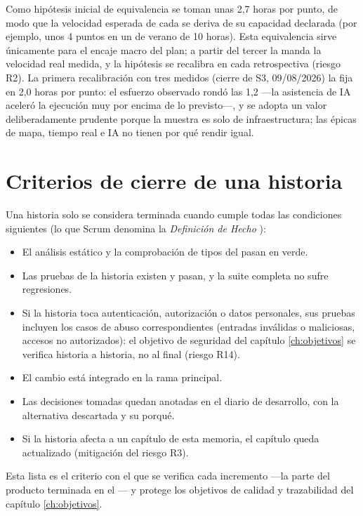 Como hipótesis inicial de equivalencia se toman unas 2,7 horas por punto, de modo que la velocidad esperada de cada  se deriva de su capacidad declarada (por ejemplo, unos 4 puntos en un  de verano de 10 horas).
Esta equivalencia sirve únicamente para el encaje macro del plan; a partir del tercer  la manda la velocidad real medida, y la hipótesis se recalibra en cada retrospectiva (riesgo R2).
La primera recalibración con tres  medidos (cierre de S3, 09/08/2026) la fija en 2,0 horas por punto: el esfuerzo observado rondó las 1,2 —la asistencia de \ac{IA} aceleró la ejecución muy por encima de lo previsto—, y se adopta un valor deliberadamente prudente porque la muestra es solo de infraestructura; las épicas de mapa, tiempo real e \ac{IA} no tienen por qué rendir igual.

\section{Criterios de cierre de una historia}
\label{sec:dod}

Una historia solo se considera terminada cuando cumple todas las condiciones siguientes (lo que Scrum denomina la \emph{Definición de Hecho} \parencite{scrum-guide}):

\begin{itemize}
  \item El análisis estático y la comprobación de tipos del  pasan en verde.
  \item Las pruebas de la historia existen y pasan, y la suite completa no sufre regresiones.
  \item Si la historia toca autenticación, autorización o datos personales, sus pruebas incluyen los casos de abuso correspondientes (entradas inválidas o maliciosas, accesos no autorizados): el objetivo de seguridad del capítulo \ref{ch:objetivos} se verifica historia a historia, no al final (riesgo R14).
  \item El cambio está integrado en la rama principal.
  \item Las decisiones tomadas quedan anotadas en el diario de desarrollo, con la alternativa descartada y su porqué.
  \item Si la historia afecta a un capítulo de esta memoria, el capítulo queda actualizado (mitigación del riesgo R3).
\end{itemize}

Esta lista es el criterio con el que se verifica cada incremento —la parte del producto terminada en el — y protege los objetivos de calidad y trazabilidad del capítulo \ref{ch:objetivos}.

